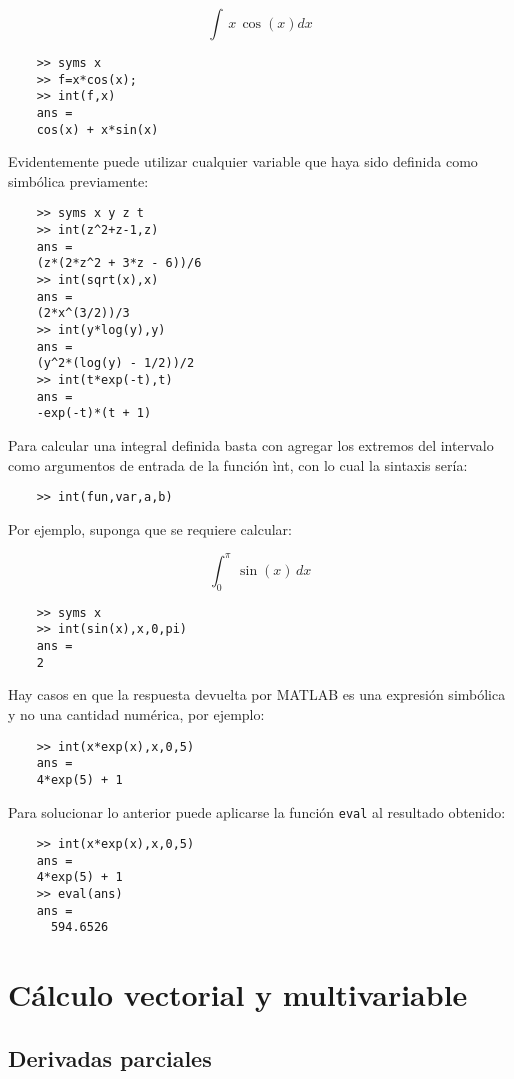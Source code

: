 $$ \int \,x\,\cos(x) dx $$

\begin{verbatim}
	>> syms x
	>> f=x*cos(x);
	>> int(f,x)
	ans =
	cos(x) + x*sin(x)
\end{verbatim}

Evidentemente puede utilizar cualquier variable que haya sido definida como simbólica previamente:

\begin{verbatim}
	>> syms x y z t
	>> int(z^2+z-1,z)
	ans =
	(z*(2*z^2 + 3*z - 6))/6
	>> int(sqrt(x),x)
	ans =
	(2*x^(3/2))/3
	>> int(y*log(y),y)
	ans =
	(y^2*(log(y) - 1/2))/2
	>> int(t*exp(-t),t)
	ans =
	-exp(-t)*(t + 1)
\end{verbatim}


Para calcular una integral definida basta con agregar los extremos del intervalo como argumentos de entrada 
de la función ìnt, con lo cual la sintaxis sería:

\begin{verbatim}
	>> int(fun,var,a,b) 
\end{verbatim}

Por ejemplo, suponga que se requiere calcular:

$$ \int_{0}^{\pi} \,\sin(x)\,dx $$

\begin{verbatim}
	>> syms x
	>> int(sin(x),x,0,pi)
	ans =
	2
\end{verbatim}

Hay casos en que la respuesta devuelta por MATLAB es una expresión simbólica y no una 
cantidad numérica, por ejemplo:

\begin{verbatim}
	>> int(x*exp(x),x,0,5)
	ans =
	4*exp(5) + 1
\end{verbatim}

Para solucionar lo anterior puede aplicarse la función \texttt{eval} al resultado obtenido:

\begin{verbatim}
	>> int(x*exp(x),x,0,5)
	ans =
	4*exp(5) + 1
	>> eval(ans)
	ans =
	  594.6526
\end{verbatim}


\section{Cálculo vectorial y multivariable}

\subsection{Derivadas parciales}

